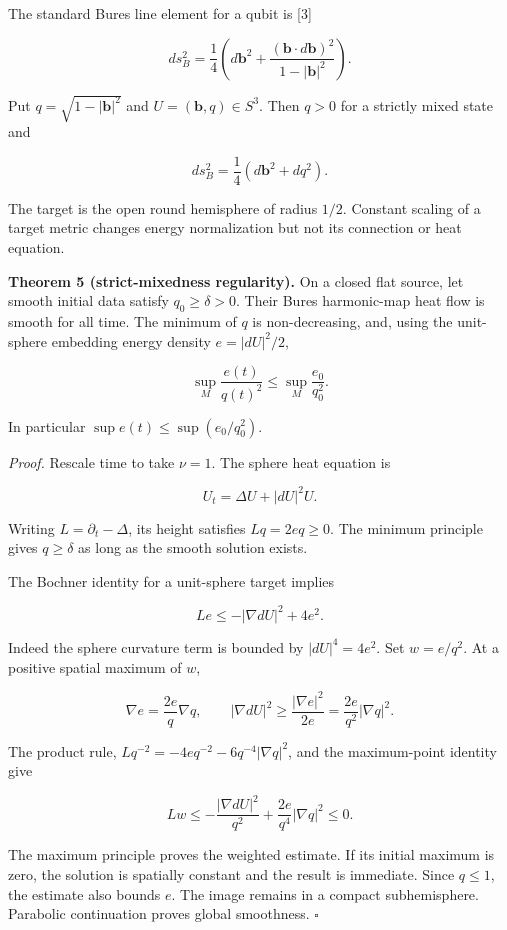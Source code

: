 \documentclass[
  11pt,
  a4paper,
]{article}
\begin{document}
The standard Bures line element for a qubit is {[}3{]}

\[
ds_B^2=\frac14\left(d\mathbf b^2+
\frac{(\mathbf b\cdot d\mathbf b)^2}{1-|\mathbf b|^2}\right).
\]

Put \(q=\sqrt{1-|\mathbf b|^2}\) and \(U=(\mathbf b,q)\in S^3\). Then \(q>0\) for a strictly mixed state and

\[
ds_B^2=\frac14(d\mathbf b^2+dq^2).
\]

The target is the open round hemisphere of radius \(1/2\). Constant scaling of a target metric changes energy normalization but not its connection or heat equation.

\textbf{Theorem 5 (strict-mixedness regularity).} On a closed flat source, let smooth initial data satisfy \(q_0\geq\delta>0\). Their Bures harmonic-map heat flow is smooth for all time. The minimum of \(q\) is non-decreasing, and, using the unit-sphere embedding energy density \(e=|dU|^2/2\),

\[
\sup_M\frac{e(t)}{q(t)^2}\leq
\sup_M\frac{e_0}{q_0^2}.
\]

In particular \(\sup e(t)\leq\sup(e_0/q_0^2)\).

\emph{Proof.} Rescale time to take \(\nu=1\). The sphere heat equation is

\[
U_t=\Delta U+|dU|^2U.
\]

Writing \(L=\partial_t-\Delta\), its height satisfies \(Lq=2eq\geq0\). The minimum principle gives \(q\geq\delta\) as long as the smooth solution exists.

The Bochner identity for a unit-sphere target implies

\[
Le\leq-|\nabla dU|^2+4e^2.
\]

Indeed the sphere curvature term is bounded by \(|dU|^4=4e^2\). Set \(w=e/q^2\). At a positive spatial maximum of \(w\),

\[
\nabla e=\frac{2e}{q}\nabla q,
\qquad
|\nabla dU|^2\geq\frac{|\nabla e|^2}{2e}
=\frac{2e}{q^2}|\nabla q|^2.
\]

The product rule, \(Lq^{-2}=-4eq^{-2}-6q^{-4}|\nabla q|^2\), and the maximum-point identity give

\[
Lw\leq-\frac{|\nabla dU|^2}{q^2}
+\frac{2e}{q^4}|\nabla q|^2\leq0.
\]

The maximum principle proves the weighted estimate. If its initial maximum is zero, the solution is spatially constant and the result is immediate. Since \(q\leq1\), the estimate also bounds \(e\). The image remains in a compact subhemisphere. Parabolic continuation proves global smoothness. \(\square\)
\end{document}
